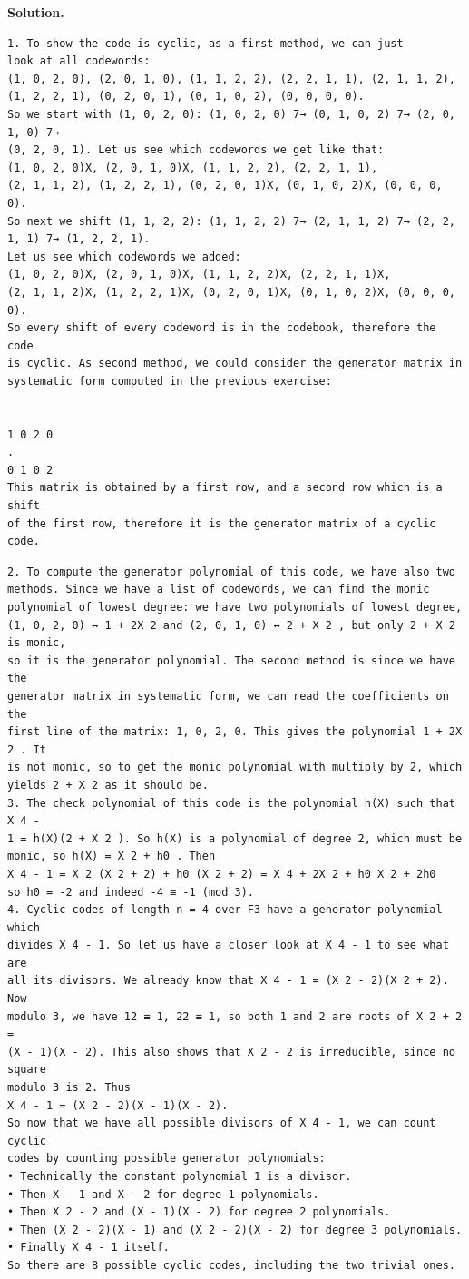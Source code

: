 \documentclass[11pt]{article}
\begin{document}
\begin{solutionbox}
\textbf{Solution.}

\begin{Verbatim}[fontsize=\small]
1. To show the code is cyclic, as a first method, we can just
look at all codewords:
(1, 0, 2, 0), (2, 0, 1, 0), (1, 1, 2, 2), (2, 2, 1, 1), (2, 1, 1, 2), (1, 2, 2, 1), (0, 2, 0, 1), (0, 1, 0, 2), (0, 0, 0, 0).
So we start with (1, 0, 2, 0): (1, 0, 2, 0) 7→ (0, 1, 0, 2) 7→ (2, 0, 1, 0) 7→
(0, 2, 0, 1). Let us see which codewords we get like that:
(1, 0, 2, 0)X, (2, 0, 1, 0)X, (1, 1, 2, 2), (2, 2, 1, 1),
(2, 1, 1, 2), (1, 2, 2, 1), (0, 2, 0, 1)X, (0, 1, 0, 2)X, (0, 0, 0, 0).
So next we shift (1, 1, 2, 2): (1, 1, 2, 2) 7→ (2, 1, 1, 2) 7→ (2, 2, 1, 1) 7→ (1, 2, 2, 1).
Let us see which codewords we added:
(1, 0, 2, 0)X, (2, 0, 1, 0)X, (1, 1, 2, 2)X, (2, 2, 1, 1)X,
(2, 1, 1, 2)X, (1, 2, 2, 1)X, (0, 2, 0, 1)X, (0, 1, 0, 2)X, (0, 0, 0, 0).
So every shift of every codeword is in the codebook, therefore the code
is cyclic. As second method, we could consider the generator matrix in
systematic form computed in the previous exercise:


1 0 2 0
.
0 1 0 2
This matrix is obtained by a first row, and a second row which is a shift
of the first row, therefore it is the generator matrix of a cyclic code.
\end{Verbatim}
\begin{Verbatim}[fontsize=\small]
2. To compute the generator polynomial of this code, we have also two
methods. Since we have a list of codewords, we can find the monic
polynomial of lowest degree: we have two polynomials of lowest degree,
(1, 0, 2, 0) ↔ 1 + 2X 2 and (2, 0, 1, 0) ↔ 2 + X 2 , but only 2 + X 2 is monic,
so it is the generator polynomial. The second method is since we have the
generator matrix in systematic form, we can read the coefficients on the
first line of the matrix: 1, 0, 2, 0. This gives the polynomial 1 + 2X 2 . It
is not monic, so to get the monic polynomial with multiply by 2, which
yields 2 + X 2 as it should be.
3. The check polynomial of this code is the polynomial h(X) such that X 4 -
1 = h(X)(2 + X 2 ). So h(X) is a polynomial of degree 2, which must be
monic, so h(X) = X 2 + h0 . Then
X 4 - 1 = X 2 (X 2 + 2) + h0 (X 2 + 2) = X 4 + 2X 2 + h0 X 2 + 2h0
so h0 = -2 and indeed -4 ≡ -1 (mod 3).
4. Cyclic codes of length n = 4 over F3 have a generator polynomial which
divides X 4 - 1. So let us have a closer look at X 4 - 1 to see what are
all its divisors. We already know that X 4 - 1 = (X 2 - 2)(X 2 + 2). Now
modulo 3, we have 12 ≡ 1, 22 ≡ 1, so both 1 and 2 are roots of X 2 + 2 =
(X - 1)(X - 2). This also shows that X 2 - 2 is irreducible, since no square
modulo 3 is 2. Thus
X 4 - 1 = (X 2 - 2)(X - 1)(X - 2).
So now that we have all possible divisors of X 4 - 1, we can count cyclic
codes by counting possible generator polynomials:
• Technically the constant polynomial 1 is a divisor.
• Then X - 1 and X - 2 for degree 1 polynomials.
• Then X 2 - 2 and (X - 1)(X - 2) for degree 2 polynomials.
• Then (X 2 - 2)(X - 1) and (X 2 - 2)(X - 2) for degree 3 polynomials.
• Finally X 4 - 1 itself.
So there are 8 possible cyclic codes, including the two trivial ones.
\end{Verbatim}
\end{solutionbox}
\end{document}
